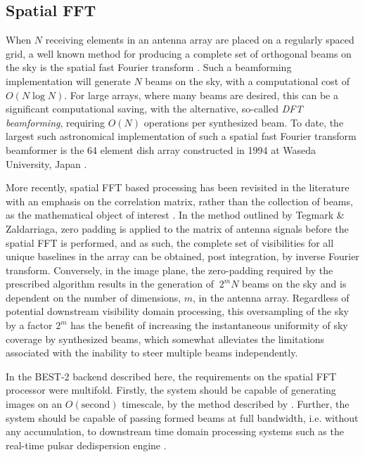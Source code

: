 \documentclass[useAMS,macros,usenatbib]{mn2e}
\begin{document}
\subsection{Spatial FFT}
\label{s-engine}
 
When $N$ receiving elements in an antenna array are placed on a regularly spaced grid, a well known method for producing a complete set of orthogonal beams on the sky is the spatial fast Fourier transform \citep{fastbeamforming}.
Such a beamforming implementation will generate $N$ beams on the sky, with a computational cost of $O(N\log{N})$. For large arrays, where many beams are desired, this can be a significant computational saving, with the alternative, so-called \emph{DFT beamforming}, requiring $O(N)$ operations per synthesized beam.
To date, the largest such astronomical implementation of such a spatial fast Fourier transform beamformer is the 64 element dish array constructed in 1994 at Waseda University, Japan \citep{2dfft}.

More recently, spatial FFT based processing has been revisited in the literature with an emphasis on the correlation matrix, rather than the collection of beams, as the mathematical object of interest \citep{fftt} \citep{omniscope}.
In the method outlined by Tegmark \& Zaldarriaga, zero padding is applied to the matrix of antenna signals before the spatial FFT is performed, and as such, the complete set of visibilities for all unique baselines in the array can be obtained, post integration, by inverse Fourier transform.
Conversely, in the image plane, the zero-padding required by the prescribed algorithm results in the generation of $~2^{m}N$ beams on the sky and is dependent on the number of dimensions, $m$, in the antenna array.
Regardless of potential downstream visibility domain processing, this oversampling of the sky by a factor $2^{m}$ has the benefit of increasing the instantaneous uniformity of sky coverage by synthesized beams, which somewhat alleviates the limitations associated with the inability to steer multiple beams independently.

In the BEST-2 backend described here, the requirements on the spatial FFT processor were multifold.
Firstly, the system should be capable of generating images on an $O(\mathrm{second})$ timescale, by the method described by \citep{fftt}.
Further, the system should be capable of passing formed beams at full bandwidth, i.e. without any accumulation, to downstream time domain processing systems such as the real-time pulsar dedispersion engine \citep{dedispersion}. 
\end{document}
